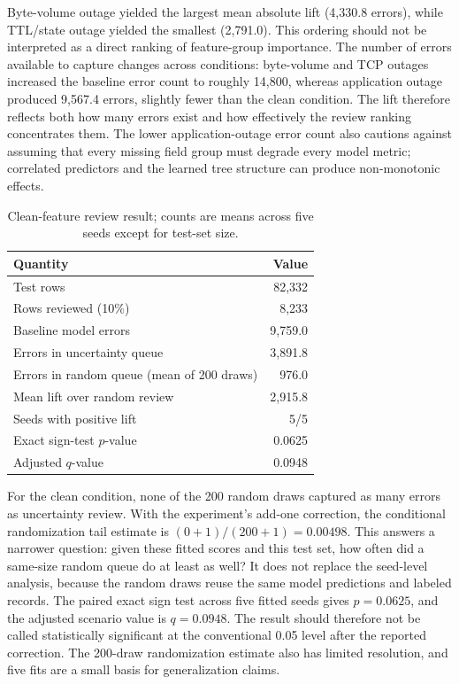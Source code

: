 \documentclass[conference]{IEEEtran}
\begin{document}
Byte-volume outage yielded the largest mean absolute lift (4,330.8 errors), while TTL/state outage yielded the smallest (2,791.0). This ordering should not be interpreted as a direct ranking of feature-group importance. The number of errors available to capture changes across conditions: byte-volume and TCP outages increased the baseline error count to roughly 14,800, whereas application outage produced 9,567.4 errors, slightly fewer than the clean condition. The lift therefore reflects both how many errors exist and how effectively the review ranking concentrates them. The lower application-outage error count also cautions against assuming that every missing field group must degrade every model metric; correlated predictors and the learned tree structure can produce non-monotonic effects.

\begin{table}[t]
\caption{Clean-feature review result; counts are means across five seeds except for test-set size.}
\label{tab:triage}
\centering
\small
\begin{tabular}{lr}
\toprule
Quantity & Value \\
\midrule
Test rows & 82,332 \\
Rows reviewed (10\%) & 8,233 \\
Baseline model errors & 9,759.0 \\
Errors in uncertainty queue & 3,891.8 \\
Errors in random queue (mean of 200 draws) & 976.0 \\
Mean lift over random review & 2,915.8 \\
Seeds with positive lift & 5/5 \\
Exact sign-test $p$-value & 0.0625 \\
Adjusted $q$-value & 0.0948 \\
\bottomrule
\end{tabular}
\end{table}

For the clean condition, none of the 200 random draws captured as many errors as uncertainty review. With the experiment's add-one correction, the conditional randomization tail estimate is $(0+1)/(200+1)=0.00498$. This answers a narrower question: given these fitted scores and this test set, how often did a same-size random queue do at least as well? It does not replace the seed-level analysis, because the random draws reuse the same model predictions and labeled records. The paired exact sign test across five fitted seeds gives $p=0.0625$, and the adjusted scenario value is $q=0.0948$. The result should therefore not be called statistically significant at the conventional 0.05 level after the reported correction. The 200-draw randomization estimate also has limited resolution, and five fits are a small basis for generalization claims.
\end{document}
